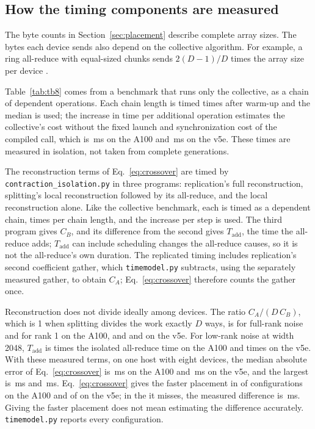 \subsection{How the timing components are measured}
\label{sec:timemodel}



The byte counts in Section~\ref{sec:placement} describe complete array sizes. The bytes
each device sends also depend on the collective algorithm. For example, a ring all-reduce
with equal-sized chunks sends $2(D-1)/D$ times the array size per device
\citep{thakur2005,patarasuk2009}.

Table~\ref{tab:tb8} comes from a benchmark that runs only the collective, as a chain of
dependent operations. Each chain length is timed \LadderRepeats{} times after warm-up and the
median is used; the increase in time per additional operation estimates the collective's cost
without the fixed launch and synchronization cost of the compiled call, which is
\LadderFloorGPU\,ms on the A100 and \LadderFloorTPU\,ms on the v5e. These times are measured
in isolation, not taken from complete generations.

The reconstruction terms of Eq.~\ref{eq:crossover} are timed by
\texttt{contraction\_isolation.py} in three programs: replication's full reconstruction,
splitting's local reconstruction followed by its all-reduce, and the local reconstruction
alone. Like the collective benchmark, each is timed as a dependent chain, \ProbeRepeats{}
times per chain length, and the increase per step is used. The third program gives $C_B$,
and its difference from the second gives $T_{\mathrm{add}}$, the time the all-reduce adds;
$T_{\mathrm{add}}$ can include scheduling changes the all-reduce causes, so it is not the
all-reduce's own duration. The replicated timing includes replication's second coefficient
gather, which \texttt{timemodel.py} subtracts, using the separately measured gather, to obtain
$C_A$; Eq.~\ref{eq:crossover} therefore counts the gather once.

Reconstruction does not divide ideally among devices. The ratio $C_A/(D\,C_B)$, which is 1
when splitting divides the work exactly $D$ ways, is \TmSplitFullGPU{} for full-rank noise and
\TmSplitLowGPU{} for rank 1 on the A100, and \TmSplitFullTPU{} and \TmSplitLowTPU{} on the
v5e. For low-rank noise at width 2048, $T_{\mathrm{add}}$ is \TmAddOverIsolatedGPU{} times the
isolated all-reduce time on the A100 and \TmAddOverIsolatedTPU{} times on the v5e. With these
measured terms, on one host with eight devices, the median absolute error of
Eq.~\ref{eq:crossover} is \TmMedianErrGPU\,ms on the A100 and \TmMedianErrTPU\,ms on the v5e,
and the largest is \TmMaxErrGPU\,ms and \TmMaxErrTPU\,ms. Eq.~\ref{eq:crossover} gives the
faster placement in \TmCorrectGPU{} of \TmConfigsGPU{} configurations on the A100 and
\TmCorrectTPU{} of \TmConfigsTPU{} on the v5e; in the \TmMisses{} it misses, the measured
difference is \TmMissGaps\,ms. Giving the faster placement does not mean estimating the
difference accurately. \texttt{timemodel.py} reports every configuration.


